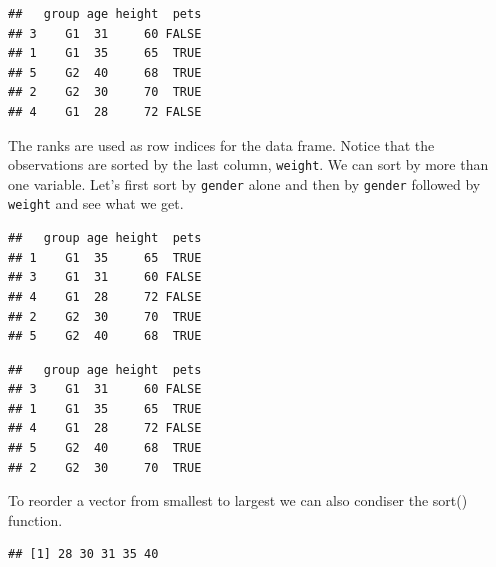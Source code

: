\documentclass[
]{book}
\newenvironment{Shaded}{\begin{snugshade}}{\end{snugshade}}
\newcommand{\KeywordTok}[1]{\textcolor[rgb]{0.13,0.29,0.53}{\textbf{#1}}}
\newcommand{\NormalTok}[1]{#1}
\newcommand{\OperatorTok}[1]{\textcolor[rgb]{0.81,0.36,0.00}{\textbf{#1}}}
\begin{document}
\begin{verbatim}
##   group age height  pets
## 3    G1  31     60 FALSE
## 1    G1  35     65  TRUE
## 5    G2  40     68  TRUE
## 2    G2  30     70  TRUE
## 4    G1  28     72 FALSE
\end{verbatim}

The ranks are used as row indices for the data frame. Notice that the observations are sorted by the last column, \texttt{weight}. We can sort by more than one variable. Let's first sort by \texttt{gender} alone and then by \texttt{gender} followed by \texttt{weight} and see what we get.

\begin{Shaded}
\end{Shaded}

\begin{verbatim}
##   group age height  pets
## 1    G1  35     65  TRUE
## 3    G1  31     60 FALSE
## 4    G1  28     72 FALSE
## 2    G2  30     70  TRUE
## 5    G2  40     68  TRUE
\end{verbatim}

\begin{Shaded}
\end{Shaded}

\begin{verbatim}
##   group age height  pets
## 3    G1  31     60 FALSE
## 1    G1  35     65  TRUE
## 4    G1  28     72 FALSE
## 5    G2  40     68  TRUE
## 2    G2  30     70  TRUE
\end{verbatim}

To reorder a vector from smallest to largest we can also condiser the sort() function.

\begin{Shaded}
\end{Shaded}

\begin{verbatim}
## [1] 28 30 31 35 40
\end{verbatim}
\end{document}

